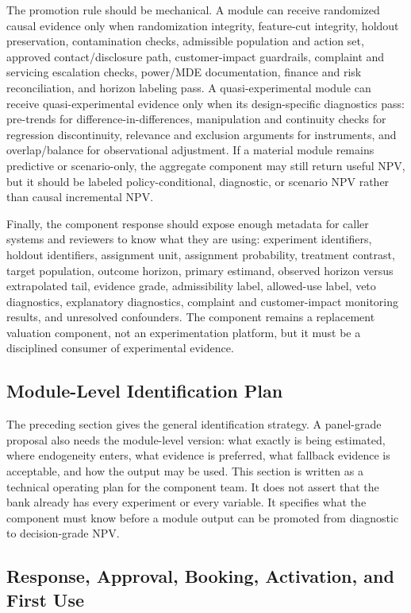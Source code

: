 \documentclass[11pt]{article}
\newcommand{\1}{\mathbf{1}}
\begin{document}
The promotion rule should be mechanical. A module can receive randomized
causal evidence only when randomization integrity, feature-cut integrity,
holdout preservation, contamination checks, admissible population and action
set, approved contact/disclosure path, customer-impact guardrails, complaint
and servicing escalation checks, power/MDE documentation, finance and risk
reconciliation, and horizon labeling pass. A quasi-experimental
module can receive quasi-experimental evidence only when its design-specific
diagnostics pass: pre-trends for difference-in-differences, manipulation and
continuity checks for regression discontinuity, relevance and exclusion
arguments for instruments, and overlap/balance for observational adjustment.
If a material module remains predictive or scenario-only, the aggregate
component may still return useful NPV, but it should be labeled
policy-conditional, diagnostic, or scenario NPV rather than causal incremental
NPV.

Finally, the component response should expose enough metadata for caller
systems and reviewers to know what they are using: experiment identifiers,
holdout identifiers, assignment unit, assignment probability, treatment
contrast, target population, outcome horizon, primary estimand, observed
horizon versus extrapolated tail, evidence grade, admissibility label,
allowed-use label, veto diagnostics, explanatory diagnostics, complaint and
customer-impact monitoring results, and unresolved confounders. The
component remains a replacement valuation component, not an experimentation
platform, but it must be a disciplined consumer of experimental evidence.

\subsection{Module-Level Identification Plan}
\label{sec:module-identification-plan}

The preceding section gives the general identification strategy. A panel-grade
proposal also needs the module-level version: what exactly is being estimated,
where endogeneity enters, what evidence is preferred, what fallback evidence
is acceptable, and how the output may be used. This section is written as a
technical operating plan for the component team. It does not assert that the
bank already has every experiment or every variable. It specifies what the
component must know before a module output can be promoted from diagnostic to
decision-grade NPV.

\subsection*{Response, Approval, Booking, Activation, and First Use}
\end{document}
